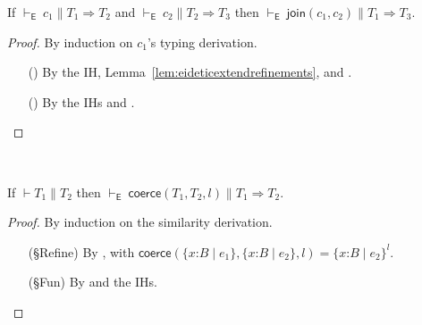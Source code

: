 \documentclass[9pt]{extarticle}
\newcommand{\ottnt}[1]{\mathit{#1}}
\newcommand{\ottsym}[1]{#1}
\begin{document}
\begin{lemma}
  \label{lem:eideticmergewf}
  If $ \mathord{  \vdash _{  \mathsf{E}  } }~ \ottnt{c_{{\mathrm{1}}}}   \mathrel{\parallel}   \ottnt{T_{{\mathrm{1}}}}  \Rightarrow  \ottnt{T_{{\mathrm{2}}}} $ and $ \mathord{  \vdash _{  \mathsf{E}  } }~ \ottnt{c_{{\mathrm{2}}}}   \mathrel{\parallel}   \ottnt{T_{{\mathrm{2}}}}  \Rightarrow  \ottnt{T_{{\mathrm{3}}}} $ then $ \mathord{  \vdash _{  \mathsf{E}  } }~  \mathsf{join} ( \ottnt{c_{{\mathrm{1}}}} , \ottnt{c_{{\mathrm{2}}}} )    \mathrel{\parallel}   \ottnt{T_{{\mathrm{1}}}}  \Rightarrow  \ottnt{T_{{\mathrm{3}}}} $.
\begin{proof}
    By induction on $\ottnt{c_{{\mathrm{1}}}}$'s typing derivation.
\begin{itemize}
    \item[(\A{Refine})] By the IH,
      Lemma~\ref{lem:eideticextendrefinements}, and .
    \item[(\A{Fun})] By the IHs and .
    \end{itemize}
  \end{proof}
\end{lemma}

\begin{lemma}
  \label{lem:eideticcoercewf}
  ~

  \noindent
  If $\vdash  \ottnt{T_{{\mathrm{1}}}}  \mathrel{\parallel}  \ottnt{T_{{\mathrm{2}}}}$ then $ \mathord{  \vdash _{  \mathsf{E}  } }~  \mathsf{coerce} ( \ottnt{T_{{\mathrm{1}}}} , \ottnt{T_{{\mathrm{2}}}} , \ottnt{l} )    \mathrel{\parallel}   \ottnt{T_{{\mathrm{1}}}}  \Rightarrow  \ottnt{T_{{\mathrm{2}}}} $.
\begin{proof}
    By induction on the similarity derivation.
\begin{itemize}
    \item[(\S{Refine})] By , with
      $ \mathsf{coerce} (  \{ \mathit{x} \mathord{:} \ottnt{B} \mathrel{\mid} \ottnt{e_{{\mathrm{1}}}} \}  ,  \{ \mathit{x} \mathord{:} \ottnt{B} \mathrel{\mid} \ottnt{e_{{\mathrm{2}}}} \}  , \ottnt{l} )   \ottsym{=}   \{ \mathit{x} \mathord{:} \ottnt{B} \mathrel{\mid} \ottnt{e_{{\mathrm{2}}}} \}^{ \ottnt{l} } $.
    \item[(\S{Fun})] By  and the IHs.
    \end{itemize}
  \end{proof}
\end{lemma}
\end{document}
